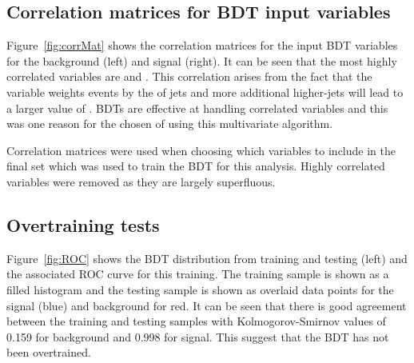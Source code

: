 \subsection{Correlation matrices for BDT input variables}


Figure~\ref{fig:corrMat} shows the correlation matrices for the input BDT variables for the background \ttbar (left) and signal \tttt (right). It can be seen that the most highly correlated variables are \njetsw and \redhadmass. This correlation arises from the fact that the \njetsw variable weights events by the \pt of jets and more additional higher-\pt jets will lead to a larger value of \redhadmass. BDTs are effective at handling correlated variables and this was one reason for the chosen of using this multivariate algorithm.


Correlation matrices were used when choosing which variables to include in the final set which was used to train the BDT for this analysis. Highly correlated variables were removed as they are largely superfluous.


\subsection{Overtraining tests}

Figure~\ref{fig:ROC} shows the BDT distribution from training and testing (left) and the associated ROC curve for this training. The training sample is shown as a filled histogram and the testing sample is shown as overlaid data points for the signal \tttt (blue) and background \ttbar for red. It can be seen that there is good agreement between the training and testing samples with Kolmogorov-Smirnov values of 0.159 for background and 0.998 for signal. This suggest that the BDT has not been overtrained.

